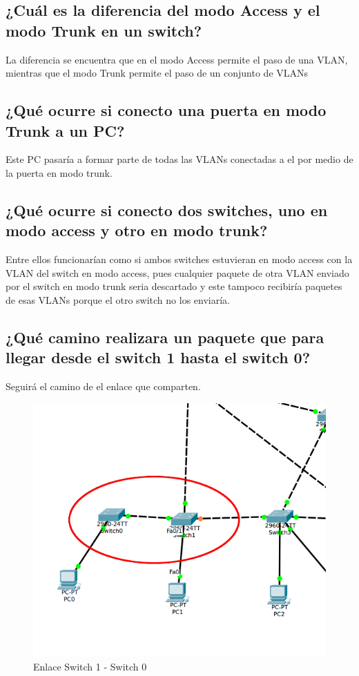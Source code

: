 \documentclass[spanish]{udpreport}
\begin{document}
\subsection{¿Cuál es la diferencia del modo Access y el modo Trunk en un switch?}
La diferencia se encuentra que en el modo Access permite el paso de una VLAN, mientras que el modo Trunk permite el paso de un conjunto de VLANs

\subsection{¿Qué ocurre si conecto una puerta en modo Trunk a un PC?}
Este PC pasaría a formar parte de todas las VLANs conectadas a el por medio de la puerta en modo trunk.

\subsection{¿Qué ocurre si conecto dos switches, uno en modo access y otro en modo trunk?}
Entre ellos funcionarían como si ambos switches estuvieran en modo access con la VLAN del switch en modo access, pues cualquier paquete de otra VLAN enviado por el switch en modo trunk seria descartado y este tampoco recibiría paquetes de esas VLANs porque el otro switch no los enviaría.

\subsection{¿Qué camino realizara un paquete que para llegar desde el switch 1 hasta el switch 0?}

Seguirá el camino de el enlace que comparten.

\begin{figure}[H]
	\label{fig:Figura 2.3}
	\centering
	\includegraphics[scale=.5]{imagenes/A4_3ep.png}
	\caption{Enlace Switch 1 - Switch  0}
\end{figure}
\end{document}
